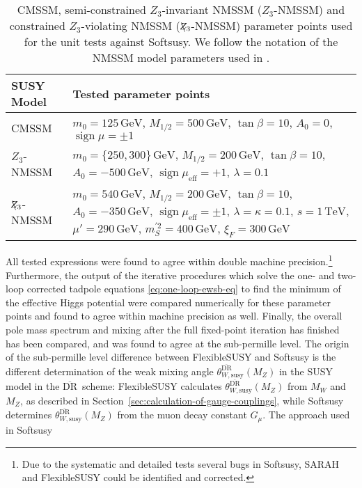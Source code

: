 \documentclass[final,3p,11pt,pdflatex]{elsarticle}
\makeatletter
\newcommand{\fs}{FlexibleSUSY\@\xspace}
\newcommand{\textoverline}[1]{$\overline{\mbox{#1}}$}
\newcommand{\DRbar}{\textoverline{DR}\xspace}
\newcommand{\unit}[1]{\,\text{#1}}      %
\newcommand{\secref}[1]{Section~\ref{#1}}
\newcommand{\Zv}{\mathbf{\backslash}\mkern-11.0mu{Z}}
\DeclareMathOperator{\sign}{sign}
\makeatother
\begin{document}
\begin{table}[tbh]
  \centering
  \begin{tabularx}{\textwidth}{lX}
    \toprule
    SUSY Model & Tested parameter points\\
    \midrule CMSSM & $m_0 = 125\unit{GeV}$, $M_{1/2} = 500\unit{GeV}$,
    $\tan\beta = 10$, $A_0 = 0$, $\sign\mu = \pm 1$
    \\
    $Z_3$-NMSSM & $m_0 = \{250,300\}\unit{GeV}$, $M_{1/2} =
    200\unit{GeV}$, $\tan\beta = 10$, $A_0 = -500\unit{GeV}$,
    $\sign\mu_\text{eff} = +1$, $\lambda = 0.1$
    \\
    $\Zv_3$-NMSSM & $m_0 = 540\unit{GeV}$, $M_{1/2} = 200\unit{GeV}$,
    $\tan\beta = 10$, $A_0 = -350\unit{GeV}$, $\sign\mu_\text{eff} =
    \pm 1$, $\lambda = \kappa = 0.1$, $s = 1\unit{TeV}$, $\mu' =
    290\unit{GeV}$, $m_S^{\prime 2} = 400\unit{GeV}$, $\xi_F =
    300\unit{GeV}$
    \\
    \bottomrule
  \end{tabularx}
  \caption{CMSSM, semi-constrained
    $Z_3$-invariant NMSSM ($Z_3$-NMSSM) and constrained
    $Z_3$-violating NMSSM ($\Zv_3$-NMSSM) parameter points
    used for the unit tests against Softsusy.
    We follow the notation of the NMSSM model parameters used in
    \cite{Ellwanger:2009dp,Allanach:2013kza}.}
  \label{tab:unit-test-parameter-points}
\end{table}
%
All tested expressions were found to agree within double machine
precision.\footnote{Due to the systematic and detailed tests several
  bugs in Softsusy, SARAH and \fs could be identified and corrected.}
Furthermore, the output of the iterative procedures which solve the
one- and two-loop corrected tadpole equations
\eqref{eq:one-loop-ewsb-eq} to find the minimum of the effective Higgs
potential were compared numerically for these parameter points and
found to agree within machine precision as well.  Finally, the overall
pole mass spectrum and mixing after the full fixed-point iteration has
finished has been compared, and was found to agree at the sub-permille
level.  The origin of the sub-permille level difference between \fs
and Softsusy is the different determination of the weak mixing angle
$\theta_{W,\text{susy}}^{\text{\DRbar}}(M_Z)$ in the SUSY model in the
\DRbar\ scheme: \fs calculates
$\theta_{W,\text{susy}}^{\text{\DRbar}}(M_Z)$ from $M_W$ and $M_Z$, as
described in \secref{sec:calculation-of-gauge-couplings}, while
Softsusy determines $\theta_{W,\text{susy}}^{\text{\DRbar}}(M_Z)$ from
the muon decay constant $G_\mu$.  The approach used in Softsusy
\end{document}
